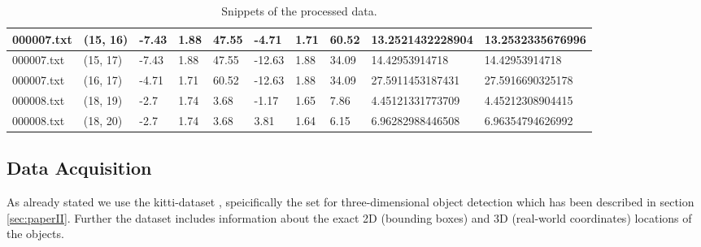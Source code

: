 \documentclass[a4paper, 11pt]{article}
\begin{document}
\begin{multicols}{2}
\begin{table*}[!ht]
\begin{subtable}[c]{\linewidth}
\begin{tabular}{|l|l|l|l|l|l|l|l|l|l|}
        000007.txt & (15, 16) & -7.43 & 1.88 & 47.55 & -4.71 & 1.71 & 60.52 & 13.2521432228904 & 13.2532335676996 \\ \hline
        000007.txt & (15, 17) & -7.43 & 1.88 & 47.55 & -12.63 & 1.88 & 34.09 & 14.42953914718 & 14.42953914718 \\ \hline
        000007.txt & (16, 17) & -4.71 & 1.71 & 60.52 & -12.63 & 1.88 & 34.09 & 27.5911453187431 & 27.5916690325178 \\ \hline
        000008.txt & (18, 19) & -2.7 & 1.74 & 3.68 & -1.17 & 1.65 & 7.86 & 4.45121331773709 & 4.45212308904415 \\ \hline
        000008.txt & (18, 20) & -2.7 & 1.74 & 3.68 & 3.81 & 1.64 & 6.15 & 6.96282988446508 & 6.96354794626992 \\ \hline
    \end{tabular}
\label{tab:snip_proc_data_interdist}
\end{subtable}
\caption{Snippets of the processed data.}
\label{tab:snip_proc_data}
\end{table*}

\subsection{Data Acquisition}
\begin{flushleft}
As already stated we use the kitti-dataset \cite{Geiger2012CVPR}, speicifically the set for three-dimensional object detection which has been described in section \ref{sec:paperII}. Further the dataset includes information about the exact 2D (bounding boxes) and 3D (real-world coordinates) locations of the objects.


\end{flushleft}
\end{multicols}
\end{document}
